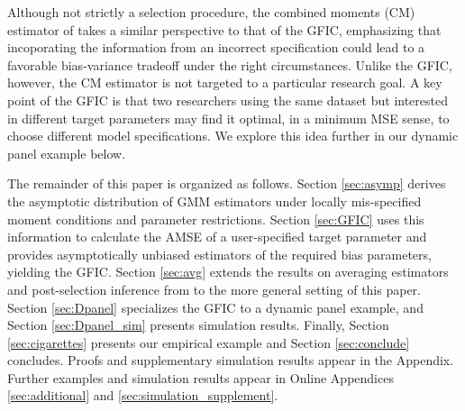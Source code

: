 Although not strictly a selection procedure, the combined moments (CM) estimator of \cite{JudgeMittelhammer} takes a similar perspective to that of the GFIC, emphasizing that incoporating the information from an incorrect specification could lead to a favorable bias-variance tradeoff under the right circumstances. 
Unlike the GFIC, however, the CM estimator is not targeted to a particular research goal.
A key point of the GFIC is that two researchers using the same dataset but interested in different target parameters may find it optimal, in a minimum MSE sense, to choose different model specifications.  
We explore this idea further in our dynamic panel example below.

The remainder of this paper is organized as follows. Section \ref{sec:asymp} derives the asymptotic distribution of GMM estimators under locally mis-specified moment conditions and parameter restrictions. 
Section \ref{sec:GFIC} uses this information to calculate the AMSE of a user-specified target parameter and provides asymptotically unbiased estimators of the required bias parameters, yielding the GFIC. 
Section \ref{sec:avg} extends the results on averaging estimators and post-selection inference from \cite{DiTraglia2016} to the more general setting of this paper.
Section \ref{sec:Dpanel} specializes the GFIC to a dynamic panel example, and Section \ref{sec:Dpanel_sim} presents simulation results.
Finally, Section \ref{sec:cigarettes} presents our empirical example and  Section \ref{sec:conclude} concludes.  
Proofs and supplementary simulation results appear in the Appendix.
Further examples and simulation results appear in Online Appendices \ref{sec:additional} and \ref{sec:simulation_supplement}.

